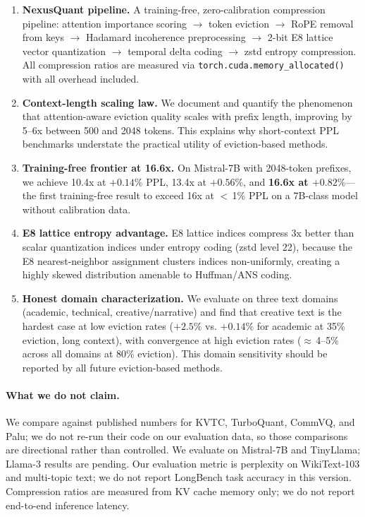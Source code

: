 \begin{enumerate}
  \item \textbf{NexusQuant pipeline.} A training-free, zero-calibration
  compression pipeline: attention importance scoring $\to$ token eviction
  $\to$ RoPE removal from keys $\to$ Hadamard incoherence preprocessing $\to$
  2-bit E8 lattice vector quantization $\to$ temporal delta coding $\to$ zstd
  entropy compression. All compression ratios are measured via
  \texttt{torch.cuda.memory\_allocated()} with all overhead included.

  \item \textbf{Context-length scaling law.} We document and quantify the
  phenomenon that attention-aware eviction quality scales with prefix length,
  improving by 5--6x between 500 and 2048 tokens. This explains why
  short-context PPL benchmarks understate the practical utility of
  eviction-based methods.

  \item \textbf{Training-free frontier at 16.6x.} On Mistral-7B with 2048-token
  prefixes, we achieve 10.4x at $+0.14\%$ PPL, 13.4x at $+0.56\%$, and
  \textbf{16.6x at $+0.82\%$}---the first training-free result to exceed 16x
  at $<$\,1\% PPL on a 7B-class model without calibration data.

  \item \textbf{E8 lattice entropy advantage.} E8 lattice indices compress 3x
  better than scalar quantization indices under entropy coding (zstd level 22),
  because the E8 nearest-neighbor assignment clusters indices non-uniformly,
  creating a highly skewed distribution amenable to Huffman/ANS coding.

  \item \textbf{Honest domain characterization.} We evaluate on three text
  domains (academic, technical, creative/narrative) and find that creative text
  is the hardest case at low eviction rates ($+2.5\%$ vs. $+0.14\%$ for
  academic at 35\% eviction, long context), with convergence at high eviction
  rates ($\approx$\,4--5\% across all domains at 80\% eviction). This domain
  sensitivity should be reported by all future eviction-based methods.
\end{enumerate}

\paragraph{What we do not claim.}
We compare against published numbers for KVTC, TurboQuant, CommVQ, and Palu;
we do not re-run their code on our evaluation data, so those comparisons are
directional rather than controlled. We evaluate on Mistral-7B and TinyLlama;
Llama-3 results are pending. Our evaluation metric is perplexity on
WikiText-103 and multi-topic text; we do not report LongBench task accuracy in
this version. Compression ratios are measured from KV cache memory only; we do
not report end-to-end inference latency.

